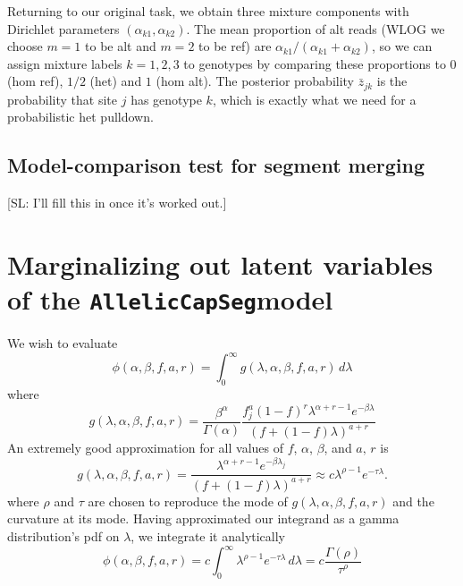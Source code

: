 \documentclass[nofootinbib,amssymb,amsmath]{revtex4}
\newcommand{\ACS}{\texttt{AllelicCapSeg}}
\def\SL#1{{\color [rgb]{0,0,0.8} [SL: #1]}}
\begin{document}
Returning to our original task, we obtain three mixture components with Dirichlet parameters $(\alpha_{k1}, \alpha_{k2})$.  The mean proportion of alt reads (WLOG we choose $m = 1$ to be alt and $m=2$ to be ref) are $\alpha_{k1}/(\alpha_{k1} + \alpha_{k2})$, so we can assign mixture labels $k = 1, 2, 3$ to genotypes by comparing these proportions to $0$ (hom ref), $1/2$ (het) and $1$ (hom alt). The posterior probability $\bar{z}_{jk}$ is the probability that site $j$ has genotype $k$, which is exactly what we need for a probabilistic het pulldown.

\subsection{Model-comparison test for segment merging} \label{likelihood-based-segment-merging}

\SL{I'll fill this in once it's worked out.}

\appendix

\section{Marginalizing out latent variables of the \ACS model} \label{marginalizing}
We wish to evaluate
%
\begin{equation}
\phi(\alpha, \beta, f, a, r) = \int_0^\infty g(\lambda, \alpha, \beta, f, a, r) \, d \lambda 
\end{equation}
%
where
%
\begin{equation}
g(\lambda, \alpha, \beta, f, a, r) =  \frac{\beta^\alpha}{\Gamma(\alpha)}  \frac{ f_j^{a} (1 - f)^{r}  \lambda^{\alpha + r - 1} e^{-\beta \lambda}}{ \left( f + (1-f) \lambda \right)^{a+r}} 
\end{equation}
%
An extremely good approximation for all values of $f$, $\alpha$, $\beta$, and $a, \, r$ is
\begin{equation}
g(\lambda, \alpha, \beta, f, a, r) = \frac{\lambda^{\alpha + r - 1} e^{-\beta \lambda_j}}{ \left( f + (1-f) \lambda \right)^{a+r}} \approx c \lambda^{\rho - 1} e^{-\tau \lambda}.
\end{equation}
where $\rho$ and $\tau$ are chosen to reproduce the mode of $g(\lambda, \alpha, \beta, f, a, r)$ and the curvature at its mode.  Having approximated our integrand as a gamma distribution's pdf on $\lambda$, we integrate it analytically
%
\begin{equation}
\phi(\alpha, \beta, f, a, r) = c \int_0^\infty \lambda^{\rho - 1} e^{-\tau \lambda} \, d \lambda = c \frac{\Gamma(\rho)}{\tau^\rho}
\end{equation}
%
\end{document}
